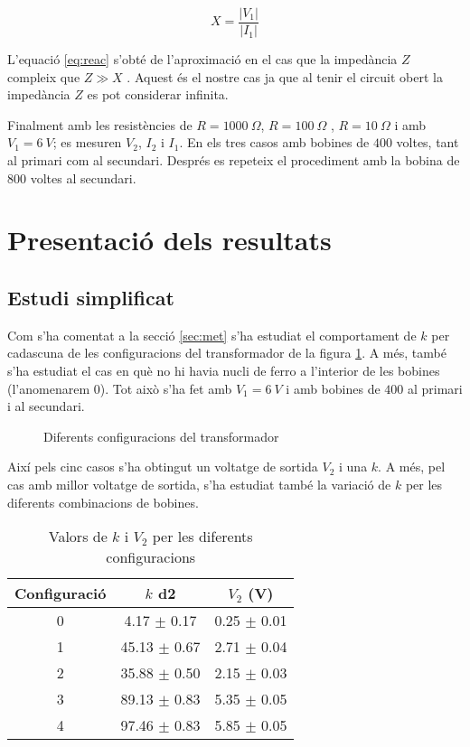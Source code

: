 \begin{equation}\label{eq:reac}
    X=\frac{|V_1|}{|I_1|}
\end{equation}

L'equació \cref{eq:reac} s'obté de l'aproximació en el cas que la impedància $Z$ compleix que $Z \gg X$ . Aquest és el nostre cas ja que al tenir el circuit obert la impedància $Z$ es pot considerar infinita. 

Finalment amb les resistències de $R=\SI{1000}{\Omega}$, $R=\SI{100}{\Omega}$ , $R=\SI{10}{\Omega}$ i amb $V_1=\SI{6}{V}$; es mesuren $V_2$, $I_2$ i $I_1$. En els tres casos amb bobines de $400$ voltes, tant al primari com al secundari. Després es repeteix el procediment amb la bobina de $800$ voltes al secundari.


\section{Presentació dels resultats}
\subsection{Estudi simplificat}

Com s'ha comentat a la secció \cref{sec:met} s'ha estudiat el comportament de $k$ per cadascuna de les configuracions del transformador de la figura \cref{fig:transfs}.
A més, també s'ha estudiat el cas en què no hi havia nucli de ferro a l'interior de les bobines (l'anomenarem $0$). Tot això s'ha fet amb $V_1=\SI{6}{V}$ i amb bobines de $400$ al primari i al secundari.

\begin{figure}
    \centering \small \sffamily
    \caption{Diferents configuracions del transformador}
    \label{fig:transfs}
\end{figure}

Així pels cinc casos s'ha obtingut un voltatge de sortida $V_2$ i una $k$. A més, pel cas amb millor voltatge de sortida, s'ha estudiat també la variació de $k$ per les diferents combinacions de bobines.

 \begin{table}[!htbp]
     \centering
     \caption{Valors de $k$ i $V_2$ per les diferents configuracions}
     \label{tab:k}
\begin{tabular}{SSS}
			\toprule
			{Configuració} & { $k$ \SI{d2}{}} & {$V_2$ (\si{V})}  \\
			 &  4.17 $\pm$ 0.17 & 0.25 $\pm$ 0.01 \\
			1 & 45.13 $\pm$ 0.67 & 2.71 $\pm$ 0.04 \\
			2 & 35.88 $\pm$ 0.50 & 2.15 $\pm$ 0.03 \\
			3 & 89.13 $\pm$ 0.83 & 5.35 $\pm$ 0.05 \\
			4 & 97.46 $\pm$ 0.83 & 5.85 $\pm$ 0.05 \\
			\bottomrule
\end{tabular}
\end{table}

